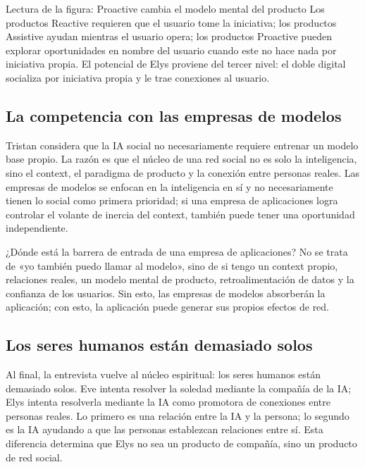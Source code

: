 \documentclass[a4paper]{article}
\begin{document}
\begin{knowledgebox}{Lectura de la figura: Proactive cambia el modelo mental del producto}
Los productos Reactive requieren que el usuario tome la iniciativa; los productos Assistive ayudan mientras el usuario opera; los productos Proactive pueden explorar oportunidades en nombre del usuario cuando este no hace nada por iniciativa propia. El potencial de Elys proviene del tercer nivel: el doble digital socializa por iniciativa propia y le trae conexiones al usuario.
\end{knowledgebox}

\subsection{La competencia con las empresas de modelos}

Tristan considera que la IA social no necesariamente requiere entrenar un modelo base propio. La razón es que el núcleo de una red social no es solo la inteligencia, sino el context, el paradigma de producto y la conexión entre personas reales. Las empresas de modelos se enfocan en la inteligencia en sí y no necesariamente tienen lo social como primera prioridad; si una empresa de aplicaciones logra controlar el volante de inercia del context, también puede tener una oportunidad independiente.

\begin{importantbox}{¿Dónde está la barrera de entrada de una empresa de aplicaciones?}
No se trata de «yo también puedo llamar al modelo», sino de si tengo un context propio, relaciones reales, un modelo mental de producto, retroalimentación de datos y la confianza de los usuarios. Sin esto, las empresas de modelos absorberán la aplicación; con esto, la aplicación puede generar sus propios efectos de red.
\end{importantbox}

\subsection{Los seres humanos están demasiado solos}

Al final, la entrevista vuelve al núcleo espiritual: los seres humanos están demasiado solos. Eve intenta resolver la soledad mediante la compañía de la IA; Elys intenta resolverla mediante la IA como promotora de conexiones entre personas reales. Lo primero es una relación entre la IA y la persona; lo segundo es la IA ayudando a que las personas establezcan relaciones entre sí. Esta diferencia determina que Elys no sea un producto de compañía, sino un producto de red social.
\end{document}
